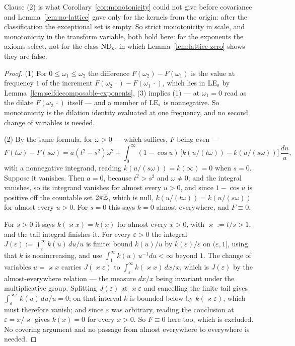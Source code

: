 Clause (2) is what Corollary~\ref{cor:monotonicity} could not give before covariance and
Lemma~\ref{lem:no-lattice} gave only for the kernels from the origin: after the
classification the exceptional set is empty. So strict monotonicity in scale, and
monotonicity in the transform variable, both hold here: for the exponents the axioms
select, not for the class $\mathrm{ND}_{\mathrm{s}}$, in which Lemma~\ref{lem:lattice-zero} shows they are false.

\begin{proof}
(1) For $0 \le \omega_1 \le \omega_2$ the difference $F(\omega_2) - F(\omega_1)$ is the value at
frequency $1$ of the increment $F(\omega_2\,\cdot) - F(\omega_1\,\cdot)$, which lies in $\mathrm{LE}_{\mathrm{s}}$
by Lemma~\ref{lem:selfdecomposable-exponents}, (3) implies (1) --- at $\omega_1 = 0$ read as
the dilate $F(\omega_2\,\cdot)$ itself --- and a member of $\mathrm{LE}_{\mathrm{s}}$ is nonnegative. So
monotonicity is the dilation identity evaluated at one frequency, and no second change of
variables is needed.

(2) By the same formula, for $\omega > 0$ --- which suffices, $F$ being even ---
\[
  F(t\omega) - F(s\omega)
  = a(t^2-s^2)\omega^2
   + \int_0^\infty (1-\cos u)\,\bigl[k(u/(t\omega)) - k(u/(s\omega))\bigr]\,\frac{du}{u},
\]
with a nonnegative integrand, reading $k(u/(s\omega)) = k(\infty) = 0$ when $s = 0$. Suppose it
vanishes. Then $a = 0$, because $t^2 > s^2$ and $\omega \ne 0$; and the integral vanishes, so
its integrand vanishes for almost every $u > 0$, and since $1 - \cos u$ is positive off the
countable set $2\pi\mathbb{Z}$, which is null, $k(u/(t\omega)) = k(u/(s\omega))$ for almost every
$u > 0$. For $s = 0$ this says $k = 0$ almost everywhere, and $F \equiv 0$.

For $s > 0$ it says $k(\varkappa x) = k(x)$ for almost every $x > 0$, with
$\varkappa := t/s > 1$, and the tail integral finishes it. For every $\varepsilon > 0$ the
integral $J(\varepsilon) := \int_\varepsilon^\infty k(u)\,du/u$ is finite: bound $k(u)/u$ by
$k(\varepsilon)/\varepsilon$ on $(\varepsilon,1]$, using that $k$ is nonincreasing, and use
$\int_1^\infty k(u)\,u^{-1}du < \infty$ beyond $1$. The change of variables $u = \varkappa x$
carries $J(\varkappa\varepsilon)$ to $\int_\varepsilon^\infty k(\varkappa x)\,dx/x$, which is
$J(\varepsilon)$ by the almost-everywhere relation --- the measure $dx/x$ being invariant under
the multiplicative group. Splitting $J(\varepsilon)$ at $\varkappa\varepsilon$ and cancelling
the finite tail gives $\int_\varepsilon^{\varkappa\varepsilon} k(u)\,du/u = 0$; on that interval
$k$ is bounded below by $k(\varkappa\varepsilon)$, which must therefore vanish; and since
$\varepsilon$ was arbitrary, reading the conclusion at $\varepsilon = x/\varkappa$ gives
$k(x) = 0$ for every $x > 0$. So $F \equiv 0$ here too, which is excluded. No covering argument
and no passage from almost everywhere to everywhere is needed.


\end{proof}
